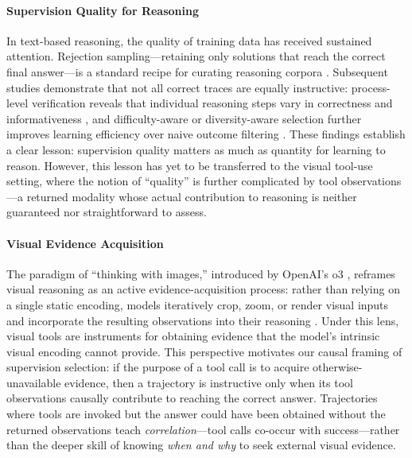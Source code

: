 \paragraph{Supervision Quality for Reasoning}
In text-based reasoning, the quality of training data has received sustained attention. Rejection sampling—retaining only solutions that reach the correct final answer—is a standard recipe for curating reasoning corpora \citep{zelikman2022star, yuan2023scaling}. Subsequent studies demonstrate that not all correct traces are equally instructive: process-level verification reveals that individual reasoning steps vary in correctness and informativeness \citep{lightman2024let, wang2024math}, and difficulty-aware or diversity-aware selection further improves learning efficiency over naive outcome filtering \citep{yu2024metamath}. These findings establish a clear lesson: supervision quality matters as much as quantity for learning to reason. However, this lesson has yet to be transferred to the visual tool-use setting, where the notion of ``quality'' is further complicated by tool observations—a returned modality whose actual contribution to reasoning is neither guaranteed nor straightforward to assess.

\paragraph{Visual Evidence Acquisition}
The paradigm of ``thinking with images,'' introduced by OpenAI's o3 \citep{openai2025o3}, reframes visual reasoning as an active evidence-acquisition process: rather than relying on a single static encoding, models iteratively crop, zoom, or render visual inputs and incorporate the resulting observations into their reasoning \citep{su2025thinkingsurvey}. Under this lens, visual tools are instruments for obtaining evidence that the model's intrinsic visual encoding cannot provide. This perspective motivates our causal framing of supervision selection: if the purpose of a tool call is to acquire otherwise-unavailable evidence, then a trajectory is instructive only when its tool observations causally contribute to reaching the correct answer. Trajectories where tools are invoked but the answer could have been obtained without the returned observations teach \emph{correlation}—tool calls co-occur with success—rather than the deeper skill of knowing \emph{when and why} to seek external visual evidence.

